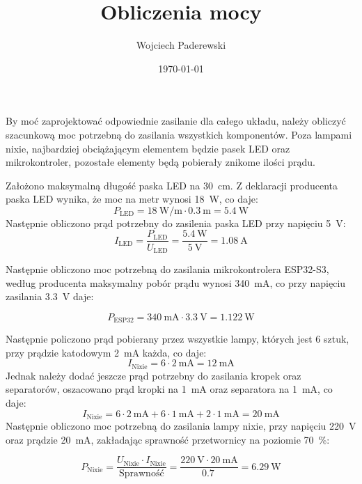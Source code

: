 \documentclass[../main.tex]{subfiles}
\author{Wojciech Paderewski}
\date{\today}
\title{Obliczenia mocy}
\begin{document}
By moć zaprojektować odpowiednie zasilanie dla całego układu, należy obliczyć szacunkową moc potrzebną do zasilania wszystkich komponentów.
Poza lampami nixie, najbardziej obciążającym elementem będzie pasek LED oraz mikrokontroler, pozostałe elementy będą pobierały znikome ilości prądu.

Założono maksymalną długość paska LED na \SI{30}{\centi\meter}. Z deklaracji producenta paska LED wynika, że moc na metr wynosi \SI{18}{\watt}, co daje:
\begin{equation}
    P_{\text{LED}} = \SI{18}{\watt\per\meter} \cdot \SI{0.3}{\meter} = \SI{5.4}{\watt}
\end{equation}
Następnie obliczono prąd potrzebny do zasilenia paska LED przy napięciu \SI{5}{\volt}:
\begin{equation}
    I_{\text{LED}} = \frac{P_{\text{LED}}}{U_{\text{LED}}} = \frac{\SI{5.4}{\watt}}{\SI{5}{\volt}} = \SI{1.08}{\ampere}
\end{equation}

Następnie obliczono moc potrzebną do zasilania mikrokontrolera ESP32-S3, według producenta maksymalny pobór prądu wynosi \SI{340}{\milli\ampere},
co przy napięciu zasilania \SI{3.3}{\volt} daje:

\begin{equation}
    P_{\text{ESP32}} = \SI{340}{\milli\ampere} \cdot \SI{3.3}{\volt} = \SI{1.122}{\watt}
\end{equation}

Następnie policzono prąd pobierany przez wszystkie lampy, których jest 6 sztuk, przy prądzie katodowym \SI{2}{\milli\ampere} każda, co daje:
\begin{equation}
    I_{\text{Nixie}} = 6 \cdot \SI{2}{\milli\ampere} = \SI{12}{\milli\ampere}
\end{equation}
Jednak należy dodać jeszcze prąd potrzebny do zasilania kropek oraz separatorów, oszacowano prąd kropki na \SI{1}{\milli\ampere} oraz separatora na \SI{1}{\milli\ampere}, co daje:
\begin{equation}
    I_{\text{Nixie}} = 6 \cdot \SI{2}{\milli\ampere} + 6 \cdot \SI{1}{\milli\ampere} + 2 \cdot \SI{1}{\milli\ampere} = \SI{20}{\milli\ampere}
\end{equation}
Następnie obliczono moc potrzebną do zasilania lampy nixie, przy napięciu \SI{220}{\volt} oraz prądzie \SI{20}{\milli\ampere}, zakładając 
sprawność przetwornicy na poziomie \SI{70}{\percent}:

\begin{equation}
    P_{\text{Nixie}} = \frac{U_{\text{Nixie}} \cdot I_{\text{Nixie}}}{\text{Sprawność}} = \frac{\SI{220}{\volt} \cdot \SI{20}{\milli\ampere}}{\SI{0.7}{}} = \SI{6.29}{\watt}
\end{equation}
\end{document}
